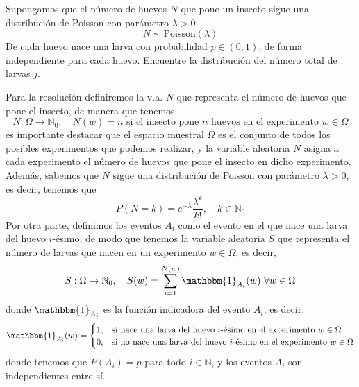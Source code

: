 \begin{ejercicio}
    Supongamos que el número de huevos $N$ que pone un insecto sigue una 
    distribución de Poisson con parámetro $\lambda > 0$:
    $$N \sim \text{Poisson}(\lambda)$$
    De cada huevo nace una larva con probabilidad $p \in (0,1)$, de forma 
    independiente para cada huevo. Encuentre la distribución del número 
    total de larvas $j$.

    Para la resolución definiremos la v.a. $N$ que representa el número de huevos que pone el insecto, de manera que tenemos
    \begin{equation*}
        N: \Omega \to \mathbb{N}_0, \quad N(w)= n \text{ si el insecto pone } n \text{ huevos en el experimento } w \in \Omega
    \end{equation*}
    es importante destacar que el espacio muestral $\Omega$ es el conjunto de todos los posibles experimentos que podemos realizar, y la variable aleatoria $N$ asigna a cada experimento el número de huevos que pone el insecto en dicho experimento. Además, sabemos que $N$ sigue una distribución de Poisson con parámetro $\lambda > 0$, es decir, tenemos que
    \begin{equation*}
        P(N=k) = e^{-\lambda} \frac{\lambda^k}{k!}, \quad k \in \mathbb{N}_0
    \end{equation*}
    Por otra parte, definimos los eventos $A_i$ como el evento en el que nace una larva del huevo $i$-ésimo, de modo que tenemos la variable aleatoria $S$ que representa el número de larvas que nacen en un experimento $w\in \Omega$, es decir,
    \begin{equation*}
        S: \Omega \to \mathbb{N}_0, \quad S(w) = \sum\limits_{i=1}^{N(w)}\mathbbm{1}_{A_i}(w) \ \forall w \in \Omega
    \end{equation*}
    donde $\mathbbm{1}_{A_i}$ es la función indicadora del evento $A_i$, es decir,
    \begin{equation*}
        \mathbbm{1}_{A_i}(w) = \begin{cases}
            1, & \text{si nace una larva del huevo } i \text{-ésimo en el experimento } w \in \Omega \\
            0, & \text{si no nace una larva del huevo } i \text{-ésimo en el experimento } w \in \Omega
        \end{cases}
    \end{equation*}
    donde tenemos que $P(A_i) = p$ para todo $i \in \mathbb{N}$, y los eventos $A_i$ son independientes entre sí. \\ \\

\end{ejercicio}
